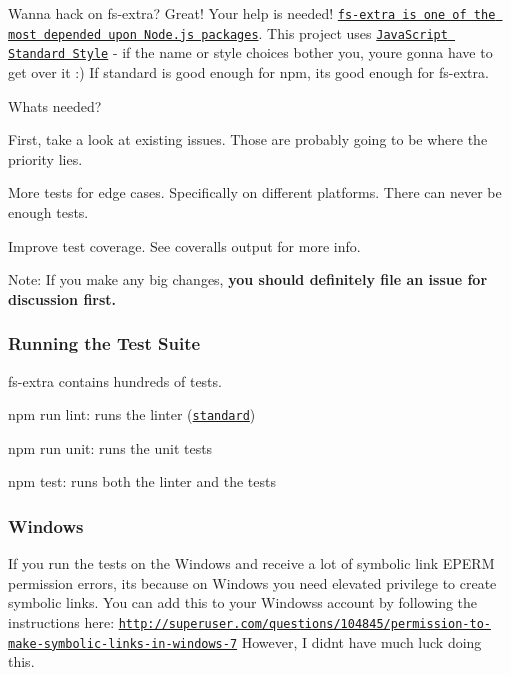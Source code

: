 Wanna hack on {\ttfamily fs-\/extra}? Great! Your help is needed! \href{http://nodei.co/npm/fs-extra.png?downloads=true&downloadRank=true&stars=true}{\tt fs-\/extra is one of the most depended upon Node.\+js packages}. This project uses \href{https://github.com/feross/standard}{\tt Java\+Script Standard Style} -\/ if the name or style choices bother you, you\textquotesingle{}re gonna have to get over it \+:) If {\ttfamily standard} is good enough for {\ttfamily npm}, it\textquotesingle{}s good enough for {\ttfamily fs-\/extra}.

\href{https://github.com/feross/standard}{\tt }

What\textquotesingle{}s needed?
\begin{DoxyItemize}
\item First, take a look at existing issues. Those are probably going to be where the priority lies.
\item More tests for edge cases. Specifically on different platforms. There can never be enough tests.
\item Improve test coverage. See coveralls output for more info.
\end{DoxyItemize}

Note\+: If you make any big changes, {\bfseries you should definitely file an issue for discussion first.}

\subsubsection*{Running the Test Suite}

fs-\/extra contains hundreds of tests.


\begin{DoxyItemize}
\item {\ttfamily npm run lint}\+: runs the linter (\href{http://standardjs.com/}{\tt standard})
\item {\ttfamily npm run unit}\+: runs the unit tests
\item {\ttfamily npm test}\+: runs both the linter and the tests
\end{DoxyItemize}

\subsubsection*{Windows}

If you run the tests on the Windows and receive a lot of symbolic link {\ttfamily E\+P\+E\+RM} permission errors, it\textquotesingle{}s because on Windows you need elevated privilege to create symbolic links. You can add this to your Windows\textquotesingle{}s account by following the instructions here\+: \href{http://superuser.com/questions/104845/permission-to-make-symbolic-links-in-windows-7}{\tt http\+://superuser.\+com/questions/104845/permission-\/to-\/make-\/symbolic-\/links-\/in-\/windows-\/7} However, I didn\textquotesingle{}t have much luck doing this.

